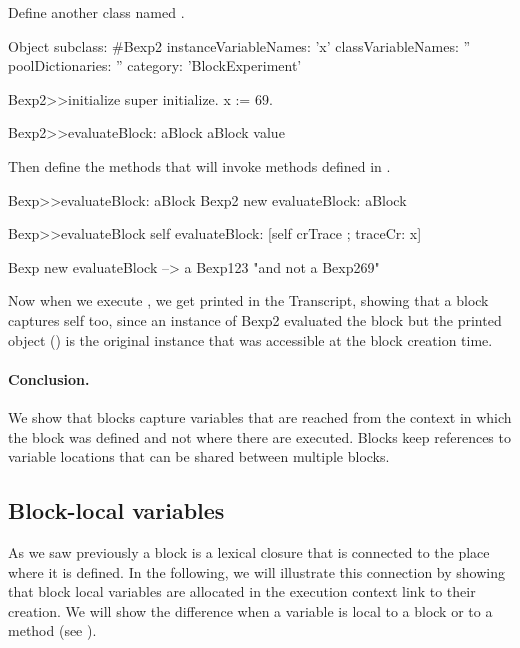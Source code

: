 \documentclass[a4paper,10pt,twoside]{book}
\begin{document}
Define another class named .

\begin{code}{}
Object subclass: #Bexp2
	instanceVariableNames: 'x'
	classVariableNames: ''
	poolDictionaries: ''
	category: 'BlockExperiment'

Bexp2>>initialize
	super initialize.
	x := 69.

Bexp2>>evaluateBlock: aBlock
	aBlock value
\end{code}

Then define the methods that will invoke  methods defined in .
\begin{code}{}
Bexp>>evaluateBlock: aBlock
	Bexp2 new evaluateBlock: aBlock

Bexp>>evaluateBlock
	self evaluateBlock: [self crTrace ; traceCr: x]
\end{code}

\begin{code}{}
Bexp new evaluateBlock
  --> a Bexp123  "and not a Bexp269"
\end{code}

Now when we execute , we get  printed in the Transcript, showing that a block captures self too, since an instance of Bexp2 evaluated the block but the printed object () is the original  instance that was accessible at the block creation time.

\paragraph{Conclusion.} We show that blocks capture variables that are reached from the context in which the block was defined and not where there are executed. Blocks keep references to variable locations that can be shared between multiple blocks. 


\subsection{Block-local variables}

As we saw previously a block is a lexical closure that is connected to the place where it is defined. In the following, we will illustrate this connection by showing that block local variables are allocated in the execution context link to their creation. We will show the difference when a variable is local to a block or to a method (see ).
\end{document}
